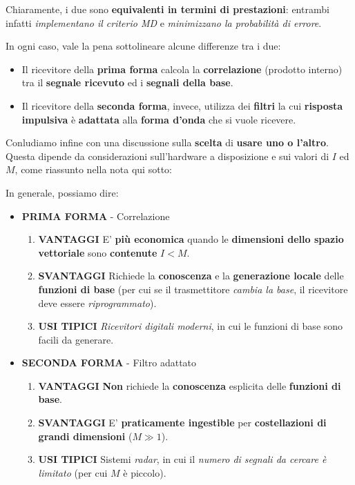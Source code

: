 Chiaramente, i due sono \textbf{equivalenti in termini di prestazioni}: entrambi
infatti \textit{implementano il criterio MD} e \textit{minimizzano la probabilità di errore}.

In ogni caso, vale la pena sottolineare alcune differenze tra i due:
\begin{itemize}
    \item Il ricevitore della \textbf{prima forma} calcola la \textbf{correlazione}
        (prodotto interno) tra il \textbf{segnale ricevuto} ed i \textbf{segnali della base}.
    \item Il ricevitore della \textbf{seconda forma}, invece, utilizza dei \textbf{filtri}
        la cui \textbf{risposta impulsiva} è \textbf{adattata} alla
        \textbf{forma d'onda} che si vuole ricevere.
\end{itemize}

Conludiamo infine con una discussione sulla \textbf{scelta} di \textbf{usare uno o l'altro}.
Questa dipende da considerazioni sull'hardware a disposizione e sui valori di $I$ ed $M$, come
riassunto nella nota qui sotto:

\begin{remark}
    In generale, possiamo dire:
    \begin{itemize}
        \item \textbf{PRIMA FORMA} - Correlazione
            \begin{enumerate}
                \item \textbf{VANTAGGI} E' \textbf{più economica} quando le
                    \textbf{dimensioni dello spazio vettoriale} sono
                    \textbf{contenute} $I<M$.
                \item \textbf{SVANTAGGI} Richiede la \textbf{conoscenza} e la
                    \textbf{generazione locale} delle \textbf{funzioni di base} (per
                    cui se il trasmettitore \textit{cambia la base}, il ricevitore deve
                    essere \textit{riprogrammato}).
                \item \textbf{USI TIPICI} \textit{Ricevitori digitali moderni}, in cui le funzioni
                    di base sono facili da generare.
            \end{enumerate}
        \item \textbf{SECONDA FORMA} - Filtro adattato
            \begin{enumerate}
                \item \textbf{VANTAGGI} \textbf{Non} richiede la \textbf{conoscenza}
                    esplicita delle \textbf{funzioni di base}.
                \item \textbf{SVANTAGGI} E' \textbf{praticamente ingestible} per
                    \textbf{costellazioni di grandi dimensioni} ($M\gg 1$).
                \item \textbf{USI TIPICI} Sistemi \textit{radar}, in cui il \textit{numero di segnali
                    da cercare è limitato} (per cui $M$ è piccolo).
            \end{enumerate}
    \end{itemize}
\end{remark}

